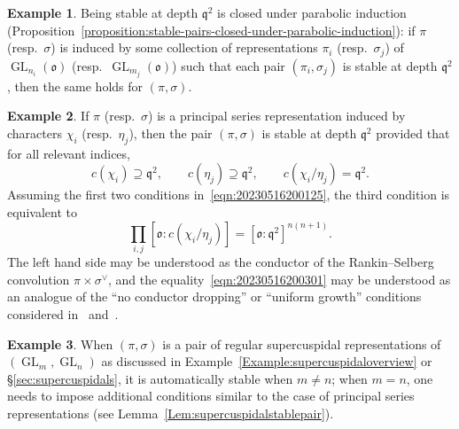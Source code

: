 \documentclass[reqno]{amsart}
\DeclareMathOperator{\GL}{GL}
\theoremstyle{plain} \newtheorem{theorem} {Theorem} \newtheorem{conjecture} {Conjecture} \newtheorem{corollary} [theorem] {Corollary} \newtheorem{proposition} [theorem] {Proposition} \newtheorem{fact} [theorem] {Fact}
\theoremstyle{definition} \newtheorem{definition} [theorem] {Definition}
\newtheorem{example} [theorem] {Example} \newtheorem{assertion}
\theoremstyle{itplain} %
\newcommand{\mfq}{\mathfrak{q}}
\begin{document}
\begin{example}\label{example:cj3m0jsjik}
  Being stable at depth $\mfq^2$ is closed under parabolic induction (Proposition~\ref{proposition:stable-pairs-closed-under-parabolic-induction}): if $\pi$ (resp.\ $\sigma$) is induced by some collection of representations $\pi_i$ (resp.\ $\sigma_j$) of $\GL_{n_i}(\mathfrak{o})$ (resp.\ $\GL_{m_j}(\mathfrak{o})$) such that each pair $(\pi_i,\sigma_j)$ is stable at depth $\mfq^2$, then the same holds for $(\pi,\sigma)$.
\end{example}
\begin{example}\label{example:20230516204714}
  If $\pi$ (resp.\ $\sigma$) is a principal series representation induced by characters $\chi_i$ (resp.\ $\eta_j$), then the pair $(\pi,\sigma)$ is stable at depth $\mfq^2$ provided that for all relevant indices,
  \begin{equation}\label{eqn:20230516200125}
    c(\chi_i) \supseteq \mfq^2, \qquad  c(\eta_j) \supseteq \mfq^2,
    \qquad
    c (\chi_i / \eta_j) = \mfq^2.
  \end{equation}
  Assuming the first two conditions in~\eqref{eqn:20230516200125}, the third condition is equivalent to
  \begin{equation}\label{eqn:20230516200301}
    \prod_{i,j} [\mathfrak{o}:c(\chi_i/\eta_j)] = {[\mathfrak{o}:\mfq^2]}^{n(n+1)}.
  \end{equation}
  The left hand side may be understood as the conductor of the Rankin--Selberg convolution $\pi \times \sigma^\vee$, and the equality~\eqref{eqn:20230516200301} may be understood as an analogue of the ``no conductor dropping'' or ``uniform growth'' conditions considered in~\cite{2020arXiv201202187N} and~\cite{2021arXiv210915230N}.
\end{example}


\begin{example}\label{example:cj3m0jzefl}
  When $(\pi,\sigma)$ is a pair of regular supercuspidal representations of $(\GL_{m},\GL_{n})$ as discussed in Example~\ref{Example:supercuspidaloverview} or \S\ref{sec:supercuspidals}, it is automatically stable when $m\neq n$; when $m=n$, one needs to impose additional conditions similar to the case of principal series representations (see Lemma~\ref{Lem:supercuspidalstablepair}).
\end{example}
\end{document}

